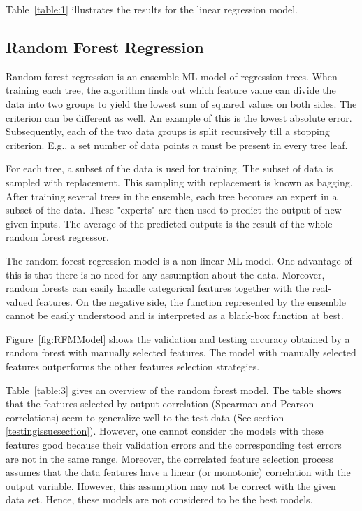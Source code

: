 \documentclass[11pt]{article}
\begin{document}
Table~\ref{table:1} illustrates the results for the linear regression model.

\subsection{Random Forest Regression}
\label{RandomForestRegressionLabel}
Random forest regression is an ensemble ML model of regression trees.
When training each tree,  the algorithm finds out which feature value can divide the data into two groups to yield the lowest sum of squared values on both sides. The criterion can be different as well. An example of this is the lowest absolute error.
Subsequently, each of the two data groups is split recursively till a stopping criterion. E.g., a set number of data points $n$ must be present in every tree leaf.

For each tree,  a subset of the data is used for training. 
The subset of data is sampled with replacement. This sampling with replacement is known as bagging.
After training several trees in the ensemble, each tree becomes an expert in a subset of the data. These "experts" are then used to predict the output of new given inputs.
The average of the predicted outputs is the result of the whole random forest regressor.

The random forest regression model is a non-linear ML model.
One advantage of this is that there is no need for any assumption about the data.
Moreover, random forests can easily handle categorical features together with the real-valued features.
On the negative side,  the function represented by the ensemble cannot be easily understood and is interpreted as a black-box function at best.

Figure~\ref{fig:RFMModel} shows the validation and testing accuracy obtained by a random forest with manually selected features.
The model with manually selected features outperforms the other features selection strategies.

Table~\ref{table:3} gives an overview of the random forest model.
The table shows that the features selected by output correlation (Spearman and Pearson correlations) seem to generalize well to the test data (See section \ref{testingissuesection}).
However,  one cannot consider the models with these features good because their validation errors and the corresponding test errors are not in the same range.
Moreover,  the correlated feature selection process assumes that the data features have a linear (or monotonic) correlation with the output variable. However, this assumption may not be correct with the given data set. Hence, these models are not considered to be the best models.
\end{document}
